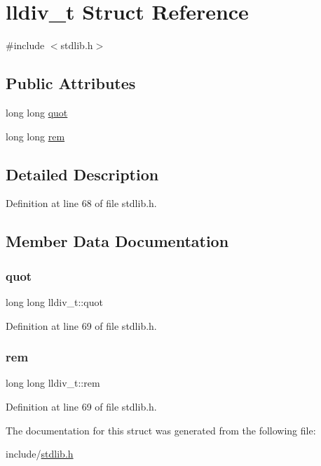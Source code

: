 \hypertarget{structlldiv__t}{}\section{lldiv\+\_\+t Struct Reference}
\label{structlldiv__t}


{\ttfamily \#include $<$stdlib.\+h$>$}

\subsection*{Public Attributes}
\begin{DoxyCompactItemize}
\item 
long long \mbox{\hyperlink{structlldiv__t_ae4d4bccdf22f41e052073f5790c5ec37}{quot}}
\item 
long long \mbox{\hyperlink{structlldiv__t_a32d4596a917aa9b496c8a49178a0e3c6}{rem}}
\end{DoxyCompactItemize}


\subsection{Detailed Description}


Definition at line 68 of file stdlib.\+h.



\subsection{Member Data Documentation}
\mbox{\label{structlldiv__t_ae4d4bccdf22f41e052073f5790c5ec37}} 
\subsubsection{\texorpdfstring{quot}{quot}}
{\footnotesize\ttfamily long long lldiv\+\_\+t\+::quot}



Definition at line 69 of file stdlib.\+h.

\mbox{\label{structlldiv__t_a32d4596a917aa9b496c8a49178a0e3c6}} 
\subsubsection{\texorpdfstring{rem}{rem}}
{\footnotesize\ttfamily long long lldiv\+\_\+t\+::rem}



Definition at line 69 of file stdlib.\+h.



The documentation for this struct was generated from the following file\+:\begin{DoxyCompactItemize}
\item 
include/\mbox{\hyperlink{stdlib_8h}{stdlib.\+h}}\end{DoxyCompactItemize}
